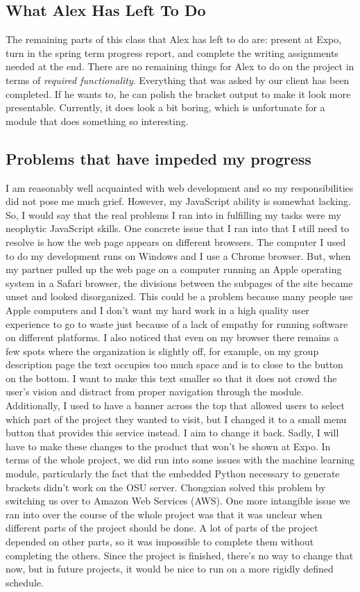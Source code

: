 \documentclass[onecolumn, draftclsnofoot,10pt, compsoc]{IEEEtran}
\begin{document}
\subsection{What Alex Has Left To Do}
The remaining parts of this class that Alex has left to do are: present at Expo, turn in the spring term progress report, and complete the writing assignments needed at the end. There are no remaining things for Alex to do on the project in terms of \emph{required functionality}. Everything that was asked by our client has been completed. If he wants to, he can polish the bracket output to make it look more presentable. Currently, it does look a bit boring, which is unfortunate for a module that does something so interesting.

\subsection{Problems that have impeded my progress}
I am reasonably well acquainted with web development and so my responsibilities did not pose me much grief. However, my JavaScript ability is somewhat lacking. So, I would say that the real problems I ran into in fulfilling my tasks were my neophytic JavaScript skills. One concrete issue that I ran into that I still need to resolve is how the web page appears on different browsers. The computer I used to do my development runs on Windows and I use a Chrome browser. But, when my partner pulled up the web page on a computer running an Apple operating system in a Safari browser, the divisions between the subpages of the site became unset and looked disorganized. This could be a problem because many people use Apple computers and I don't want my hard work in a high quality user experience to go to waste just because of a lack of empathy for running software on different platforms. I also noticed that even on my browser there remains a few spots where the organization is slightly off, for example, on my group description page the text occupies too much space and is to close to the button on the bottom. I want to make this text smaller so that it does not crowd the user's vision and distract from proper navigation through the module. Additionally, I used to have a banner across the top that allowed users to select which part of the project they wanted to visit, but I changed it to a small menu button that provides this service instead. I aim to change it back. Sadly, I will have to make these changes to the product that won't be shown at Expo. In terms of the whole project, we did run into some issues with the machine learning module, particularly the fact that the embedded Python necessary to generate brackets didn't work on the OSU server. Chongxian solved this problem by switching us over to Amazon Web Services (AWS). One more intangible issue we ran into over the course of the whole project was that it was unclear when different parts of the project should be done. A lot of parts of the project depended on other parts, so it was impossible to complete them without completing the others. Since the project is finished, there's no way to change that now, but in future projects, it would be nice to run on a more rigidly defined schedule.
\end{document}

